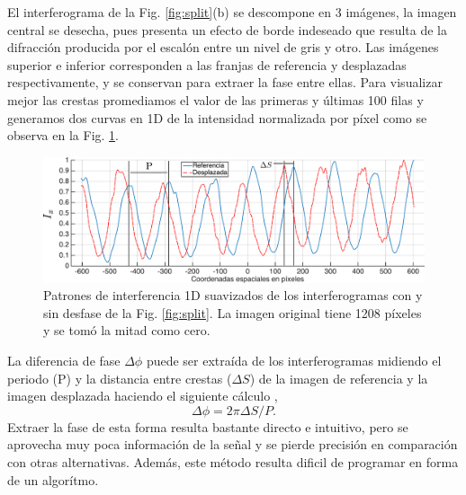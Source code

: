 El interferograma de la Fig. \ref{fig:split}(b) se descompone en 3
imágenes, la imagen central se desecha, pues presenta un efecto de
borde indeseado que resulta de la difracción producida por el escalón
entre un nivel de gris y otro. Las imágenes superior e inferior corresponden a las franjas
de referencia y desplazadas respectivamente, y se conservan para
extraer la fase entre ellas. 
Para visualizar mejor las crestas
promediamos el valor de las primeras y últimas 100 filas y generamos
dos curvas en 1D de la intensidad normalizada por píxel como se
observa en la Fig. \ref{fig:fringes_plot}.  
\begin{figure}[h!]
\centering
\includegraphics[scale=0.4]{fringes_plot_edited.pdf}
\caption[Patrones de interferencia 1D de interferogramas con y sin
desfase]{Patrones de interferencia 1D suavizados de los interferogramas con y sin
  desfase de la Fig. \ref{fig:split}. La imagen original tiene 1208
  píxeles y se tomó la mitad como cero.}
\label{fig:fringes_plot}
\end{figure}
La diferencia de fase $\Delta\phi$ puede ser extraída de los
interferogramas midiendo el periodo (P) y la distancia entre crestas ($\Delta S$) de la imagen de
referencia y la imagen desplazada haciendo el siguiente cálculo ,
$$\Delta\phi = 2\pi \Delta S/P.$$
Extraer la fase de esta forma resulta bastante directo e intuitivo,
pero se aprovecha muy poca información de la señal y se pierde
precisión en comparación con otras alternativas. Además, este método resulta dificil de
programar en forma de un algorítmo. 

